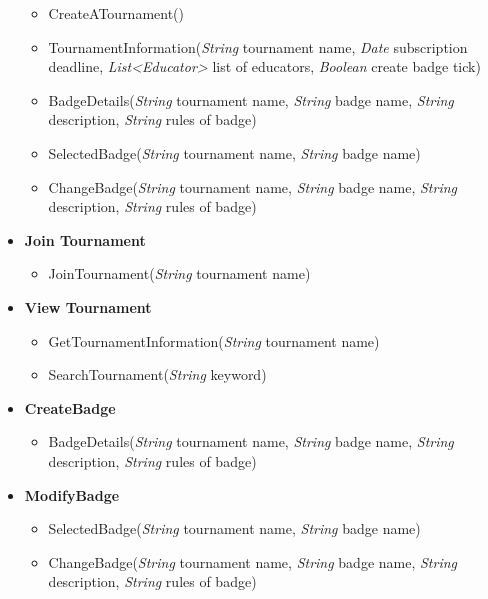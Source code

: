 \begin{itemize}
\begin{itemize}
        \item CreateATournament()
        \item TournamentInformation(\textit{String} tournament name, \textit{Date} subscription deadline, \textit{List\textless Educator\textgreater}  list of educators, \textit{Boolean} create badge tick)
        \item BadgeDetails(\textit{String} tournament name, \textit{String} badge name, \textit{String} description, \textit{String} rules of badge)
        \item SelectedBadge(\textit{String} tournament name, \textit{String} badge name)
        \item ChangeBadge(\textit{String} tournament name, \textit{String} badge name, \textit{String} description, \textit{String} rules of badge)
\end{itemize}

    \item \textbf{\textbf{Join Tournament}}
\begin{itemize}
        \item JoinTournament(\textit{String} tournament name)
\end{itemize}

    \item \textbf{\textbf{View Tournament}}

\begin{itemize}
        \item GetTournamentInformation(\textit{String} tournament name)
        \item SearchTournament(\textit{String} keyword)
\end{itemize}

    \item \textbf{\textbf{CreateBadge}}
\begin{itemize}

    \item BadgeDetails(\textit{String} tournament name, \textit{String} badge name, \textit{String} description, \textit{String} rules of badge)
\end{itemize}

    \item \textbf{\textbf{ModifyBadge}}

\begin{itemize}
        \item SelectedBadge(\textit{String} tournament name, \textit{String} badge name)
        \item ChangeBadge(\textit{String} tournament name, \textit{String} badge name, \textit{String} description, \textit{String} rules of badge)
\end{itemize}


\end{itemize}
